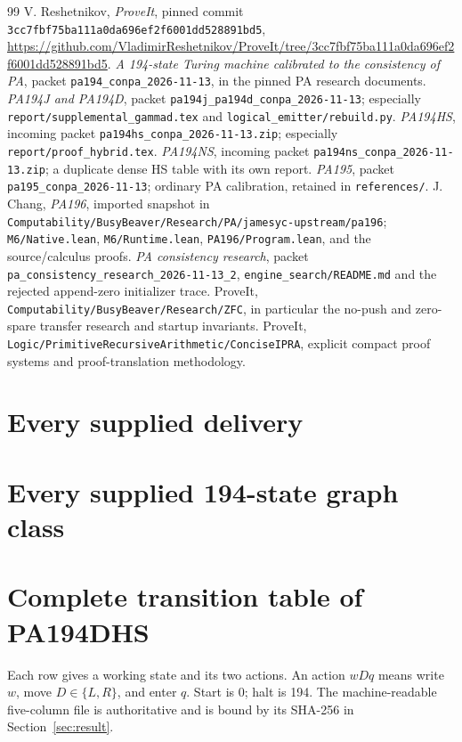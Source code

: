 \documentclass[11pt,letterpaper]{article}
\newcommand{\file}[1]{\texttt{\nolinkurl{#1}}}
\begin{document}
\begin{thebibliography}{99}
 V. Reshetnikov, \emph{ProveIt}, pinned commit
\file{3cc7fbf75ba111a0da696ef2f6001dd528891bd5},
\url{https://github.com/VladimirReshetnikov/ProveIt/tree/3cc7fbf75ba111a0da696ef2f6001dd528891bd5}.
 \emph{A 194-state Turing machine calibrated to the consistency of PA},
packet \file{pa194_conpa_2026-11-13}, in the pinned PA research documents.
 \emph{PA194J and PA194D}, packet
\file{pa194j_pa194d_conpa_2026-11-13}; especially \file{report/supplemental_gammad.tex}
and \file{logical_emitter/rebuild.py}.
 \emph{PA194HS}, incoming packet
\file{pa194hs_conpa_2026-11-13.zip}; especially \file{report/proof_hybrid.tex}.
 \emph{PA194NS}, incoming packet
\file{pa194ns_conpa_2026-11-13.zip}; a duplicate dense HS table with its own report.
 \emph{PA195}, packet \file{pa195_conpa_2026-11-13};
ordinary PA calibration, retained in \file{references/}.
 J. Chang, \emph{PA196}, imported snapshot in
\file{Computability/BusyBeaver/Research/PA/jamesyc-upstream/pa196};
\file{M6/Native.lean}, \file{M6/Runtime.lean}, \file{PA196/Program.lean},
and the source/calculus proofs.
 \emph{PA consistency research}, packet
\file{pa_consistency_research_2026-11-13_2},
\file{engine_search/README.md} and the rejected append-zero initializer trace.
 ProveIt, \file{Computability/BusyBeaver/Research/ZFC},
in particular the no-push and zero-spare transfer research and startup invariants.
 ProveIt, \file{Logic/PrimitiveRecursiveArithmetic/ConciseIPRA},
explicit compact proof systems and proof-translation methodology.
\end{thebibliography}

\appendix
\section{Every supplied delivery}
\label{app:ledger}


\section{Every supplied 194-state graph class}
\label{app:frontier}


\section{Complete transition table of PA194DHS}
\label{app:table}
Each row gives a working state and its two actions. An action $wDq$
means write $w$, move $D\in\{L,R\}$, and enter $q$. Start is 0; halt is
194. The machine-readable five-column file is authoritative and is bound
by its SHA-256 in Section~\ref{sec:result}.

\end{document}
